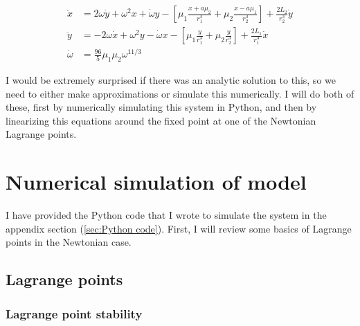 \documentclass{article}
\begin{document}
\begin{align}
    \ddot{x} &= 2 \omega \dot{y} + \omega^2 x + \dot{\omega} y - \left[ \mu_1 \frac{x+a \mu_2}{r_1^3} + \mu_2 \frac{x-a \mu_1}{r_2^3} \right] + \frac{2 L_2}{r_2^3} \dot{y} \label{eq:x dot dot} \\
    \ddot{y} &= -2 \omega \dot{x} + \omega^2 y - \dot{\omega} x - \left[ \mu_1 \frac{y}{r_1^3} + \mu_2 \frac{y}{r_2^3} \right] + \frac{2 L_1}{r_1^3} \dot{x} \label{eq:y dot dot}\\
    \dot{\omega} &= \frac{96}{5} \mu_1 \mu_2 \omega^{11/3}
\end{align}

I would be extremely surprised if there was an analytic solution to this, so we need to either make approximations or simulate this numerically. I will do both of these, first by  numerically simulating this system in Python, and then by linearizing this equations around the fixed point at one of the  Newtonian Lagrange points.






\section{Numerical simulation of model}\label{sec:Numerics}

I have provided the Python code that I wrote to simulate the system in the appendix section (\ref{sec:Python code}). First, I will review some basics of Lagrange points in the Newtonian case.



\subsection{Lagrange points}

\subsubsection{Lagrange point stability}
\end{document}
